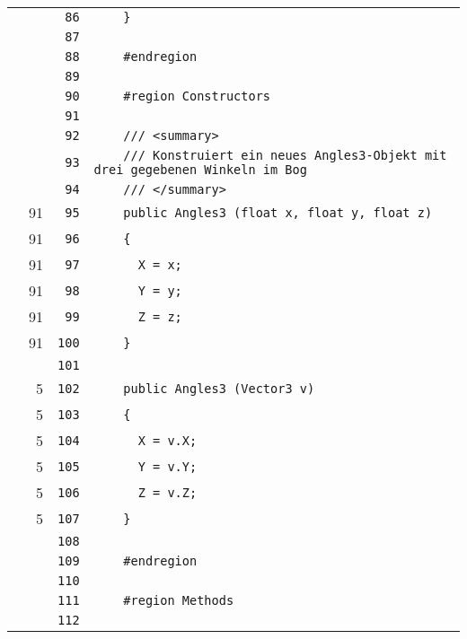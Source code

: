 \documentclass[a4paper,10pt]{article}
\begin{document}
\begin{longtable}[l]{lrrl}
\cellcolor{gray} &  & \verb~86~ & \verb~    }~\\
\cellcolor{gray} &  & \verb~87~ & \verb~~\\
\cellcolor{gray} &  & \verb~88~ & \verb~    #endregion~\\
\cellcolor{gray} &  & \verb~89~ & \verb~~\\
\cellcolor{gray} &  & \verb~90~ & \verb~    #region Constructors~\\
\cellcolor{gray} &  & \verb~91~ & \verb~~\\
\cellcolor{gray} &  & \verb~92~ & \verb~    /// <summary>~\\
\cellcolor{gray} &  & \verb~93~ & \verb~    /// Konstruiert ein neues Angles3-Objekt mit drei gegebenen Winkeln im Bog~\\
\cellcolor{gray} &  & \verb~94~ & \verb~    /// </summary>~\\
\cellcolor{green} & 91 & \verb~95~ & \verb~    public Angles3 (float x, float y, float z)~\\
\cellcolor{green} & 91 & \verb~96~ & \verb~    {~\\
\cellcolor{green} & 91 & \verb~97~ & \verb~      X = x;~\\
\cellcolor{green} & 91 & \verb~98~ & \verb~      Y = y;~\\
\cellcolor{green} & 91 & \verb~99~ & \verb~      Z = z;~\\
\cellcolor{green} & 91 & \verb~100~ & \verb~    }~\\
\cellcolor{gray} &  & \verb~101~ & \verb~~\\
\cellcolor{green} & 5 & \verb~102~ & \verb~    public Angles3 (Vector3 v)~\\
\cellcolor{green} & 5 & \verb~103~ & \verb~    {~\\
\cellcolor{green} & 5 & \verb~104~ & \verb~      X = v.X;~\\
\cellcolor{green} & 5 & \verb~105~ & \verb~      Y = v.Y;~\\
\cellcolor{green} & 5 & \verb~106~ & \verb~      Z = v.Z;~\\
\cellcolor{green} & 5 & \verb~107~ & \verb~    }~\\
\cellcolor{gray} &  & \verb~108~ & \verb~~\\
\cellcolor{gray} &  & \verb~109~ & \verb~    #endregion~\\
\cellcolor{gray} &  & \verb~110~ & \verb~~\\
\cellcolor{gray} &  & \verb~111~ & \verb~    #region Methods~\\
\cellcolor{gray} &  & \verb~112~ & \verb~~\\

\end{longtable}
\end{document}
